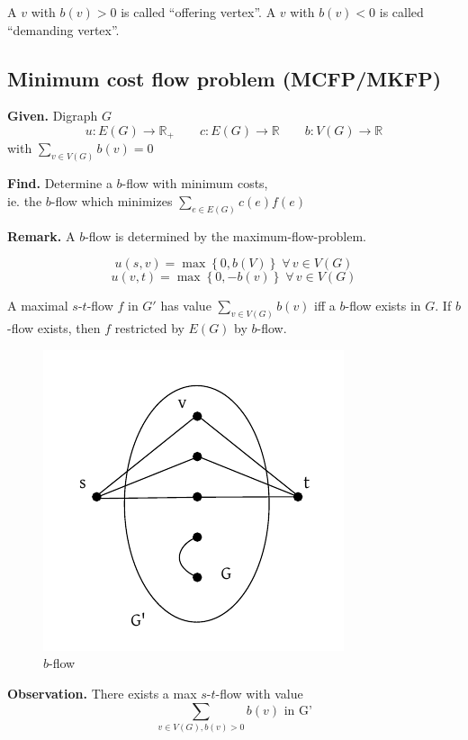 \documentclass{article}
\newcommand{\set}[1]{\left\{#1\right\}}
\newcommand{\given}[1]{\textbf{Given.} #1\par}
\newcommand{\find}[1]{\textbf{Find.} #1\par}
\newcommand{\flow}[2]{$#1$-$#2$-flow}
\newcommand{\fall}{\;\forall\,}
\begin{document}
A $v$ with $b(v) > 0$ is called ``offering vertex''.
A $v$ with $b(v) < 0$ is called ``demanding vertex''.

\subsection{Minimum cost flow problem (MCFP/MKFP)}
%
\given{Digraph $G$
\[ u: E(G) \rightarrow \mathbb{R}_+
  \qquad c: E(G) \rightarrow \mathbb{R}
  \qquad b: V(G) \rightarrow \mathbb{R}
\] with $\sum_{v \in V(G)} b(v) = 0$}
\find{Determine a $b$-flow with minimum costs, \\
  ie. the $b$-flow which minimizes $\sum_{e \in E(G)} c(e) f(e)$
}

\textbf{Remark.}
  A $b$-flow is determined by the maximum-flow-problem.

\[
  u(s, v) = \max{\set{0, b(V)}} \fall v \in V(G)
\] \[
  u(v, t) = \max{\set{0, -b(v)}} \fall v \in V(G)
\]

A maximal \flow st $f$ in $G'$ has value $\sum_{v \in V(G)} b(v)$
iff a $b$-flow exists in $G$. If $b$-flow exists, then $f$ restricted by $E(G)$ by $b$-flow.

\begin{figure}[ht]
 \begin{center}
  \includegraphics{img/b_flow.pdf}
  \caption{$b$-flow}
 \end{center}
\end{figure}

\textbf{Observation.}
  There exists a max \flow st with value
  \[ \sum_{v \in V(G), b(v) > 0} b(v) \text{ in G'} \]
\end{document}
